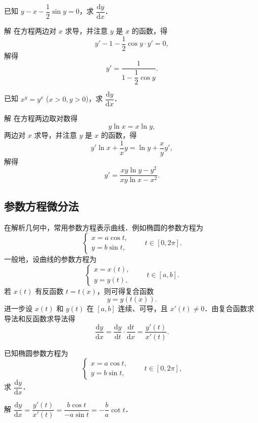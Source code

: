 \begin{example}\label{ex:4-3-3}
已知 $y-x-\dfrac{1}{2}\sin y=0$，求 $\dfrac{\mathrm{d}y}{\mathrm{d}x}$．

解 在方程两边对 $x$ 求导，并注意 $y$ 是 $x$ 的函数，得
\[
y'-1-\frac{1}{2}\cos y\cdot y'=0,
\]
解得
\[
y'=\frac{1}{1-\dfrac{1}{2}\cos y}.
\]
\end{example}

\begin{example}\label{ex:4-3-4}
已知 $x^{y}=y^{x}$ ($x>0,y>0$)，求 $\dfrac{\mathrm{d}y}{\mathrm{d}x}$．

解 在方程两边取对数得
\[
y\ln x=x\ln y,
\]
两边对 $x$ 求导，并注意 $y$ 是 $x$ 的函数，得
\[
y'\ln x+\frac{1}{x}y=\ln y+\frac{x}{y}y',
\]
解得
\[
y'=\frac{xy\ln y-y^{2}}{xy\ln x-x^{2}}.
\]
\end{example}

\subsection{参数方程微分法}

在解析几何中，常用参数方程表示曲线．例如椭圆的参数方程为
\[
\begin{cases}
x=a\cos t,\\
y=b\sin t,
\end{cases}
\qquad t\in[0,2\pi].
\]
一般地，设曲线的参数方程为
\[
\begin{cases}
x=x(t),\\
y=y(t),
\end{cases}
\qquad t\in[a,b].
\]
若 $x(t)$ 有反函数 $t=t(x)$，则可得复合函数
\[
y=y(t(x)).
\]
进一步设 $x(t)$ 和 $y(t)$ 在 $[a,b]$ 连续、可导，且 $x'(t)\neq0$．由复合函数求导法和反函数求导法得
\[
\frac{\mathrm{d}y}{\mathrm{d}x}=\frac{\mathrm{d}y}{\mathrm{d}t}\cdot\frac{\mathrm{d}t}{\mathrm{d}x}=\frac{y'(t)}{x'(t)}.
\]

\begin{example}\label{ex:4-3-5}
已知椭圆参数方程为
\[
\begin{cases}
x=a\cos t,\\
y=b\sin t,
\end{cases}
\qquad t\in[0,2\pi],
\]
求 $\dfrac{\mathrm{d}y}{\mathrm{d}x}$．

解 $\dfrac{\mathrm{d}y}{\mathrm{d}x}=\dfrac{y'(t)}{x'(t)}=\dfrac{b\cos t}{-a\sin t}=-\dfrac{b}{a}\cot t$．
\end{example}

